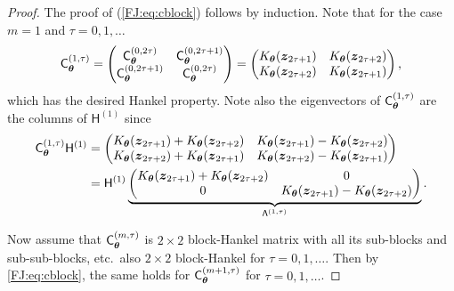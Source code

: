 \documentclass[graybox,footinfo]{svmult}
\begin{document}
\begin{proof}
    The proof of (\ref{FJ:eq:cblock}) follows by induction.  Note that for the case $m=1$ and $\tau = 0, 1, \ldots$
    \begin{equation*}
        \mathsf{C}_{{\boldsymbol{\theta}}}^{(1,\tau)} 
        = \begin{pmatrix} \mathsf{C}_{{\boldsymbol{\theta}}}^{(0, 2\tau)} & \mathsf{C}_{{\boldsymbol{\theta}}}^{(0,2 \tau+1)} \\
        	\mathsf{C}_{{\boldsymbol{\theta}}}^{(0,2 \tau+1)} & \mathsf{C}_{{\boldsymbol{\theta}}}^{(0,2 \tau)}
        \end{pmatrix}
        =  \begin{pmatrix}
        K_{\boldsymbol{\theta}}({\boldsymbol{z}}_{2 \tau+1}) & K_{\boldsymbol{\theta}}({\boldsymbol{z}}_{2 \tau+2}) \\
        K_{\boldsymbol{\theta}}({\boldsymbol{z}}_{2 \tau+2}) & K_{\boldsymbol{\theta}}({\boldsymbol{z}}_{2 \tau+1}) 
        \end{pmatrix} ,
    \end{equation*}
   which has the desired Hankel property. Note also the eigenvectors of $\mathsf{C}_{{\boldsymbol{\theta}}}^{(1,\tau)}$ are the columns of $\mathsf{H}^{(1)}$ since   
   \begin{align*}
        \mathsf{C}_{{\boldsymbol{\theta}}}^{(1,\tau)} \mathsf{H}^{(1)} & =  \begin{pmatrix}
        K_{\boldsymbol{\theta}}({\boldsymbol{z}}_{2 \tau+1}) + K_{\boldsymbol{\theta}}({\boldsymbol{z}}_{2 \tau+2}) & K_{\boldsymbol{\theta}}({\boldsymbol{z}}_{2 \tau+1}) - K_{\boldsymbol{\theta}}({\boldsymbol{z}}_{2 \tau+2})\\
        K_{\boldsymbol{\theta}}({\boldsymbol{z}}_{2 \tau+2}) + K_{\boldsymbol{\theta}}({\boldsymbol{z}}_{2 \tau+1}) &  K_{\boldsymbol{\theta}}({\boldsymbol{z}}_{2 \tau+2}) - K_{\boldsymbol{\theta}}({\boldsymbol{z}}_{2 \tau+1}) 
        \end{pmatrix} \\
        & = \mathsf{H}^{(1)} \underbrace{\begin{pmatrix}
        K_{\boldsymbol{\theta}}({\boldsymbol{z}}_{2 \tau+1}) + K_{\boldsymbol{\theta}}({\boldsymbol{z}}_{2 \tau+2}) & 0\\
        0 &   K_{\boldsymbol{\theta}}({\boldsymbol{z}}_{2 \tau+1}) - K_{\boldsymbol{\theta}}({\boldsymbol{z}}_{2 \tau+2})
        \end{pmatrix}}_{\mathsf{\Lambda}^{(1,\tau)}} .
    \end{align*}

   Now assume that $\mathsf{C}_{{\boldsymbol{\theta}}}^{(m,\tau)}$ is $2\times 2$ block-Hankel matrix with all its sub-blocks and sub-sub-blocks, etc.\ also $2\times 2$ block-Hankel for $\tau = 0, 1, \ldots$.  Then by \eqref{FJ:eq:cblock}, the same holds for $\mathsf{C}_{{\boldsymbol{\theta}}}^{(m+1,\tau)}$ for $\tau = 0, 1, \ldots$. 
   

\end{proof}
\end{document}
